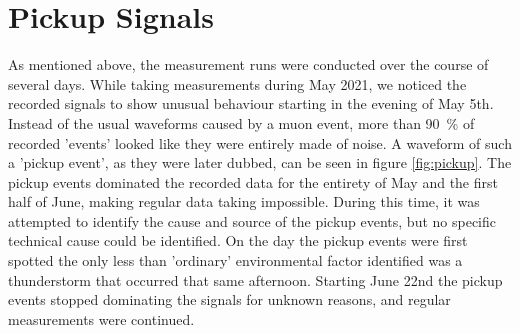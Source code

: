     




    
    

\section{Pickup Signals}

    As mentioned above, the measurement runs were conducted over the course of several days. While taking measurements during May 2021, we noticed the recorded signals to show unusual behaviour starting in the evening of May 5th. Instead of the usual waveforms caused by a muon event, more than \SI{90}{\percent} of recorded 'events' looked like they were entirely made of noise. A waveform of such a 'pickup event', as they were later dubbed, can be seen in figure \ref{fig:pickup}. The pickup events dominated the recorded data for the entirety of May and the first half of June, making regular data taking impossible. During this time, it was attempted to identify the cause and source of the pickup events, but no specific technical cause could be identified. On the day the pickup events were first spotted the only less than 'ordinary' environmental factor identified was a thunderstorm that occurred that same afternoon. Starting June 22nd the pickup events stopped dominating the signals for unknown reasons, and regular measurements were continued.
    
    
